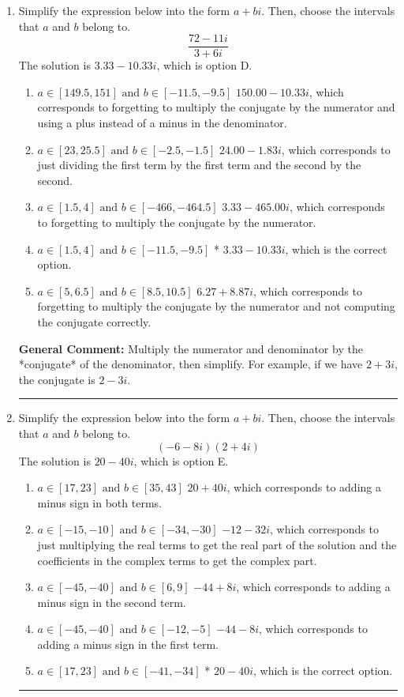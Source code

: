 \documentclass{extbook}[14pt]
\newcommand{\litem}[1]{\item #1

\rule{\textwidth}{0.4pt}}
\begin{document}
\begin{enumerate}
\litem{
Simplify the expression below into the form $a+bi$. Then, choose the intervals that $a$ and $b$ belong to.
\[ \frac{72 - 11 i}{3 + 6 i} \]
The solution is \( 3.33  - 10.33 i \), which is option D.\begin{enumerate}[label=\Alph*.]
\item \( a \in [149.5, 151] \text{ and } b \in [-11.5, -9.5] \)
 $150.00  - 10.33 i$, which corresponds to forgetting to multiply the conjugate by the numerator and using a plus instead of a minus in the denominator.
\item \( a \in [23, 25.5] \text{ and } b \in [-2.5, -1.5] \)
 $24.00  - 1.83 i$, which corresponds to just dividing the first term by the first term and the second by the second.
\item \( a \in [1.5, 4] \text{ and } b \in [-466, -464.5] \)
 $3.33  - 465.00 i$, which corresponds to forgetting to multiply the conjugate by the numerator.
\item \( a \in [1.5, 4] \text{ and } b \in [-11.5, -9.5] \)
* $3.33  - 10.33 i$, which is the correct option.
\item \( a \in [5, 6.5] \text{ and } b \in [8.5, 10.5] \)
 $6.27  + 8.87 i$, which corresponds to forgetting to multiply the conjugate by the numerator and not computing the conjugate correctly.
\end{enumerate}

\textbf{General Comment:} Multiply the numerator and denominator by the *conjugate* of the denominator, then simplify. For example, if we have $2+3i$, the conjugate is $2-3i$.
}
\litem{
Simplify the expression below into the form $a+bi$. Then, choose the intervals that $a$ and $b$ belong to.
\[ (-6 - 8 i)(2 + 4 i) \]
The solution is \( 20 - 40 i \), which is option E.\begin{enumerate}[label=\Alph*.]
\item \( a \in [17, 23] \text{ and } b \in [35, 43] \)
 $20 + 40 i$, which corresponds to adding a minus sign in both terms.
\item \( a \in [-15, -10] \text{ and } b \in [-34, -30] \)
 $-12 - 32 i$, which corresponds to just multiplying the real terms to get the real part of the solution and the coefficients in the complex terms to get the complex part.
\item \( a \in [-45, -40] \text{ and } b \in [6, 9] \)
 $-44 + 8 i$, which corresponds to adding a minus sign in the second term.
\item \( a \in [-45, -40] \text{ and } b \in [-12, -5] \)
 $-44 - 8 i$, which corresponds to adding a minus sign in the first term.
\item \( a \in [17, 23] \text{ and } b \in [-41, -34] \)
* $20 - 40 i$, which is the correct option.
\end{enumerate}

}
\end{enumerate}
\end{document}
